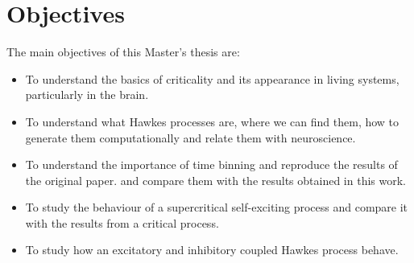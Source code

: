 \chapter{Objectives} \label{ch:objectives}

The main objectives of this Master's thesis are:

\begin{itemize}
    \item To understand the basics of criticality and its appearance in living systems, particularly in the brain. 
    \item To understand what Hawkes processes are, where we can find them, how to generate them computationally and relate them with neuroscience.
    \item To understand the importance of time binning and reproduce the results of the original paper.
    \cite{notarmuzi2021percolation} and compare them with the results obtained in this work.
    \item To study the behaviour of a supercritical self-exciting process and compare it with the results from a critical process. 
    \item To study how an excitatory and inhibitory coupled Hawkes process behave.
\end{itemize}